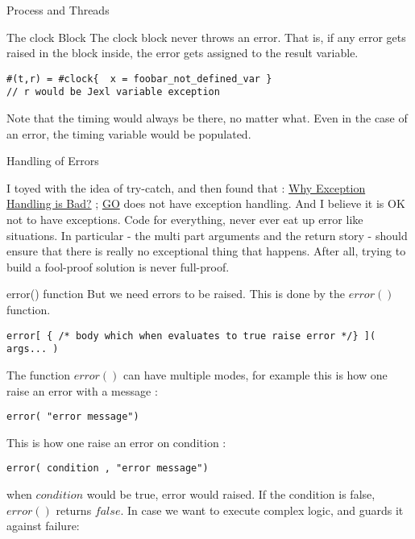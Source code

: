 \begin{section}{Process and Threads}
\begin{subsection}{The clock Block}
The clock block never throws an error.
That is, if any error gets raised in the block inside,
the error gets assigned to the result variable.
\begin{lstlisting}[style=JexlStyle]
#(t,r) = #clock{  x = foobar_not_defined_var }
// r would be Jexl variable exception
\end{lstlisting}

Note that the timing would always be there, 
no matter what. Even in the case of an error, 
the timing variable would be populated.

\end{subsection}

\end{section}

\begin{section}{Handling of Errors}

I toyed with the idea of try-catch, and then found that : 
\href{http://stackoverflow.com/questions/1736146/why-is-exception-handling-bad}{Why Exception Handling is Bad?} ; 
\href{https://gobyexample.com/errors}{GO} does not have exception handling. 
And I believe it is OK not to have exceptions.
Code for everything, never ever eat up error like situations. 
In particular - the multi part arguments and the return story - should ensure that there is really no exceptional thing that happens. 
After all, trying to build a fool-proof solution is never full-proof.

\begin{subsection}{error() function}
But we need errors to be raised. This is done by the $error()$ function.

\begin{lstlisting}[style=JexlStyle]
error[ { /* body which when evaluates to true raise error */} ]( args... )   
\end{lstlisting}
The function $error()$ can have multiple modes, 
for example this is how one raise an error with a message :
\begin{lstlisting}[style=JexlStyle]
error( "error message")   
\end{lstlisting}
This is how one raise an error on condition :
\begin{lstlisting}[style=JexlStyle]
error( condition , "error message")   
\end{lstlisting}
when $condition$ would be true, error would raised.
If the condition is false, $error()$ returns $false$.
In case we want to execute complex logic, and guards it against failure:


\end{subsection}
\end{section}
